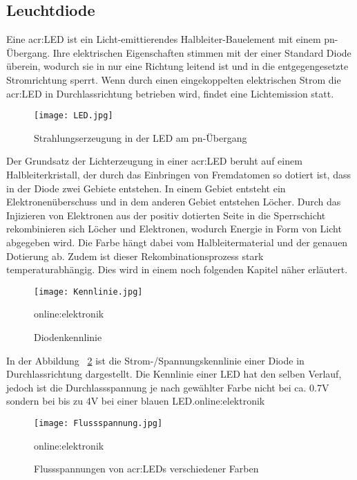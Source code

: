 \subsection{Leuchtdiode}
\label{sub:led}

Eine \gls{acr:LED} ist ein Licht-emittierendes Halbleiter-Bauelement mit einem pn-Übergang. Ihre elektrischen Eigenschaften stimmen mit der einer Standard Diode überein, wodurch sie in nur eine Richtung leitend ist und in die entgegengesetzte Stromrichtung sperrt. Wenn durch einen eingekoppelten elektrischen Strom die \gls{acr:LED} in Durchlassrichtung betrieben wird, findet eine Lichtemission statt.\cite{slabke} 

\begin{figure}[H]
	\centering
	\texttt{[image: LED.jpg]}
	\caption[Strahlungserzeugung in der LED am pn-Übergang]{Strahlungserzeugung in der LED am pn-Übergang} \cite{slabke}
	\label{fig:LED}
\end{figure}

Der Grundsatz der Lichterzeugung in einer \gls{acr:LED} beruht auf einem Halbleiterkristall, der durch das Einbringen von Fremdatomen so dotiert ist, dass in der Diode zwei Gebiete entstehen. In einem Gebiet entsteht ein Elektronenüberschuss und in dem anderen Gebiet entstehen Löcher. Durch das Injizieren von Elektronen aus der positiv dotierten Seite in die Sperrschicht rekombinieren sich Löcher und Elektronen, wodurch Energie in Form von Licht abgegeben wird.\cite{slabke} Die Farbe hängt dabei vom Halbleitermaterial und der genauen Dotierung ab. Zudem ist dieser Rekombinationsprozess stark temperaturabhängig.\cite{heringElektrotechnikUndElektronik2018} Dies wird in einem noch folgenden Kapitel näher erläutert.

\begin{figure}[H]
	\centering
	\texttt{[image: Kennlinie.jpg]}
	\caption[Diodenkennlinie]{Diodenkennlinie} 
	\gls{online:elektronik}
	\label{fig:Kennlinie}
\end{figure}


In der Abbildung ~\ref{fig:Kennlinie} ist die Strom-/Spannungskennlinie einer Diode in Durchlassrichtung
dargestellt. Die Kennlinie einer LED hat den selben Verlauf, jedoch ist die Durchlassspannung
je nach gewählter Farbe nicht bei ca. 0.7V sondern bei bis zu 4V bei einer blauen LED.\gls{online:elektronik} 

\begin{figure}[H]
	\centering
	\texttt{[image: Flussspannung.jpg]}
	\caption[Flussspannungen von \gls{acr:LED}s verschiedener Farben]{Flussspannungen von \gls{acr:LED}s verschiedener Farben} 
	\gls{online:elektronik}
	\label{fig:Flussspannung}
\end{figure}

